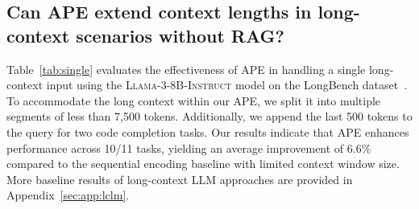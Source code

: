\subsection{Can APE extend context lengths in long-context scenarios without RAG?}

Table~\ref{tab:single} evaluates the effectiveness of APE in handling a single long-context input using the \textsc{Llama-3-8B-Instruct} model on the LongBench dataset~\citep{bai2023longbench}. To accommodate the long context within our APE, we split it into multiple segments of less than 7,500 tokens. Additionally, we append the last 500 tokens to the query for two code completion tasks. Our results indicate that APE enhances performance across 10/11 tasks, yielding an average improvement of 6.6\% compared to the sequential encoding baseline with limited context window size. More baseline results of long-context LLM approaches are provided in Appendix~\ref{sec:app:lclm}.

\begin{table}[h]
\centering
\caption{\textbf{Performance comparison across different long-context tasks on LongBench~\citep{bai2023longbench}.}}
\vspace{-0.7em}
\label{tab:single}
\end{table}

